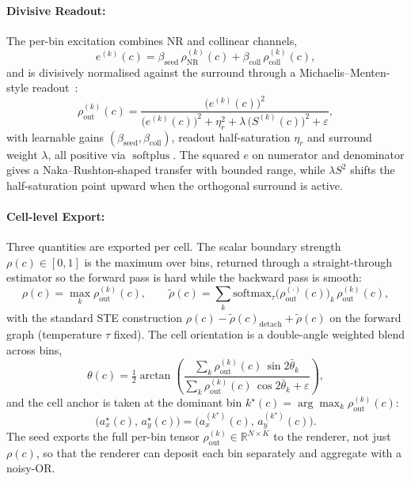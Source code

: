 \documentclass[11pt,a4paper]{article}
\newcommand{\R}{\mathbb{R}}
\newcommand{\softplus}{\operatorname{softplus}}
\begin{document}
\paragraph{Divisive Readout:}
The per-bin excitation combines NR and collinear channels,
\begin{equation}\label{eq:e}
  e^{(k)}(c) = \beta_{\mathrm{seed}}\, \rho_{\mathrm{NR}}^{(k)}(c) + \beta_{\mathrm{coll}}\, \rho_{\mathrm{coll}}^{(k)}(c),
\end{equation}
and is divisively normalised against the surround through a Michaelis--Menten-style readout~\cite{naka1966srod,heeger1992normalisation}:
\begin{equation}\label{eq:rho-out-bin}
  \boxed{\;
  \rho_{\mathrm{out}}^{(k)}(c) = \frac{\bigl(e^{(k)}(c)\bigr)^2}
                                       {\bigl(e^{(k)}(c)\bigr)^2 + \eta_r^2 + \lambda\, \bigl(S^{(k)}(c)\bigr)^2 + \varepsilon},\;}
\end{equation}
with learnable gains $(\beta_{\mathrm{seed}}, \beta_{\mathrm{coll}})$, readout half-saturation $\eta_r$ and surround weight $\lambda$, all positive via $\softplus$. The squared $e$ on numerator and denominator gives a Naka--Rushton-shaped transfer with bounded range, while $\lambda S^2$ shifts the half-saturation point upward when the orthogonal surround is active.

\paragraph{Cell-level Export:}
Three quantities are exported per cell. The scalar boundary strength $\rho(c) \in [0, 1]$ is the maximum over bins, returned through a straight-through estimator so the forward pass is hard while the backward pass is smooth:
\begin{equation}\label{eq:rho-cell}
  \rho(c) = \max_k \rho_{\mathrm{out}}^{(k)}(c),
  \qquad
  \tilde\rho(c) = \sum_k \mathrm{softmax}_\tau\!\bigl(\rho_{\mathrm{out}}^{(\cdot)}(c)\bigr)_k\, \rho_{\mathrm{out}}^{(k)}(c),
\end{equation}
with the standard STE construction $\rho(c) - \tilde\rho(c)_{\mathrm{detach}} + \tilde\rho(c)$ on the forward graph (temperature $\tau$ fixed). The cell orientation is a double-angle weighted blend across bins,
\begin{equation}\label{eq:theta-cell}
  \theta(c) = \tfrac{1}{2}\arctan\!\left(
    \frac{\sum_k \rho_{\mathrm{out}}^{(k)}(c)\, \sin 2\bar\theta_k}
         {\sum_k \rho_{\mathrm{out}}^{(k)}(c)\, \cos 2\bar\theta_k + \varepsilon}\right),
\end{equation}
and the cell anchor is taken at the dominant bin $k^\star(c) = \arg\max_k \rho_{\mathrm{out}}^{(k)}(c)$:
\begin{equation}\label{eq:anchor-cell}
  \bigl(a_x^\star(c),\, a_y^\star(c)\bigr) = \bigl(a_x^{(k^\star)}(c),\, a_y^{(k^\star)}(c)\bigr).
\end{equation}
The seed exports the full per-bin tensor $\rho_{\mathrm{out}}^{(k)} \in \R^{N\times K}$ to the renderer, not just $\rho(c)$, so that the renderer can deposit each bin separately and aggregate with a noisy-OR.
\end{document}

